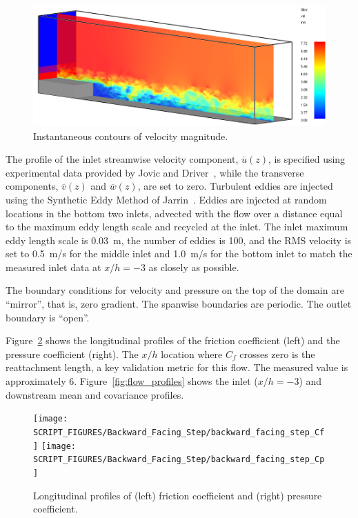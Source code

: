 \begin{figure}[!htb]
    \centering
    \includegraphics[width=\textwidth]{FIGURES/Backward_Facing_Step/backward_facing_step_vel_slice}
    \caption[Instantaneous contours of velocity magnitude]{Instantaneous contours of velocity magnitude.}
    \label{fig:vel_slice}
\end{figure}

The profile of the inlet streamwise velocity component, $\overline{u}(z)$, is specified using experimental data provided by Jovic and Driver~\cite{JD:1994}, while the transverse components, $\overline{v}(z)$ and $\overline{w}(z)$, are set to zero.  Turbulent eddies are injected using the Synthetic Eddy Method of Jarrin~\cite{Jarrin:2008}.  Eddies are injected at random locations in the bottom two inlets, advected with the flow over a distance equal to the maximum eddy length scale and recycled at the inlet.  The inlet maximum eddy length scale is 0.03~m, the number of eddies is 100, and the RMS velocity is set to 0.5~m/s for the middle inlet and 1.0~m/s for the bottom inlet to match the measured inlet data at $x/h=-3$ as closely as possible.

The boundary conditions for velocity and pressure on the top of the domain are ``mirror'', that is, zero gradient.  The spanwise boundaries are periodic.  The outlet boundary is ``open''.

Figure~\ref{fig:friction_pressure_coefficients} shows the longitudinal profiles of the friction coefficient (left) and the pressure coefficient (right).  The $x/h$ location where $C_f$ crosses zero is the reattachment length, a key validation metric for this flow. The measured value is approximately 6. Figure~\ref{fig:flow_profiles} shows the inlet ($x/h=-3$) and downstream mean and covariance profiles.

\begin{figure}[!htb]
    \centering
    \texttt{[image: SCRIPT\_FIGURES/Backward\_Facing\_Step/backward\_facing\_step\_Cf]}
    \texttt{[image: SCRIPT\_FIGURES/Backward\_Facing\_Step/backward\_facing\_step\_Cp]}
    \caption[Friction coefficient and pressure coefficient]{Longitudinal profiles of (left) friction coefficient and (right) pressure coefficient.}
    \label{fig:friction_pressure_coefficients}
\end{figure}


